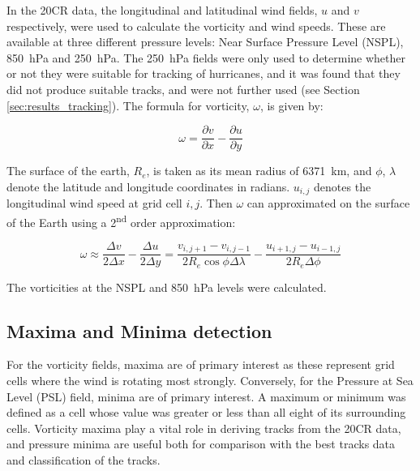 \documentclass[pdftex,12pt,a4paper]{report}
\newcommand{\ts}{\textsuperscript}
\begin{document}
In the 20CR data, the longitudinal and latitudinal wind fields, $u$ and $v$ respectively, were used
to calculate the vorticity and wind speeds. These are available at three different pressure levels:
Near Surface Pressure Level (NSPL), \SI{850}{hPa} and \SI{250}{hPa}. The \SI{250}{hPa} fields were
only used to determine whether or not they were suitable for tracking of hurricanes, and it was
found that they did not produce suitable tracks, and were not further used (see Section
\ref{sec:results_tracking}). The formula for vorticity, $\omega$, is given by:

\begin{equation}
    \omega = \frac{\partial v}{\partial x} - \frac{\partial u}{\partial y}
    \label{eqn:vorticity}
\end{equation}

The surface of the earth, $R_e$, is taken as its mean radius of \SI{6371}{km}, and $\phi$, $\lambda$
denote the latitude and longitude coordinates in radians. $u_{i, j}$ denotes the longitudinal wind
speed at grid cell $i, j$. Then $\omega$ can approximated on the surface of the Earth using a
2\ts{nd} order approximation: %


\begin{equation}
    \omega \approx \frac{\Delta v}{2 \Delta x} - \frac{\Delta u}{2 \Delta y} = \frac{v_{i,j+1} - v_{i,j-1}}{2 R_e \cos{\phi} \Delta \lambda} - \frac{u_{i+1,j} - u_{i-1,j}}{2 R_e \Delta \phi }
    \label{eqn:vorticity_2nd_order}
\end{equation}

The vorticities at the NSPL and \SI{850}{hPa} levels were calculated.

\subsection{Maxima and Minima detection}
\label{sec:methods_maxima_minima}

For the vorticity fields, maxima are of primary interest as these represent grid cells where the
wind is rotating most strongly. Conversely, for the Pressure at Sea Level (PSL) field, minima are of
primary interest. A maximum or minimum was defined as a cell whose value was greater or less than
all eight of its surrounding cells. Vorticity maxima play a vital role in deriving tracks from the
20CR data, and pressure minima are useful both for comparison with the best tracks data and
classification of the tracks.
\end{document}
